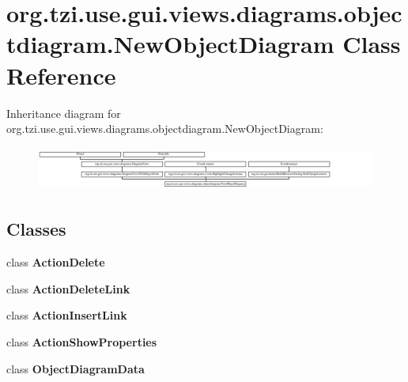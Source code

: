 \hypertarget{classorg_1_1tzi_1_1use_1_1gui_1_1views_1_1diagrams_1_1objectdiagram_1_1_new_object_diagram}{\section{org.\-tzi.\-use.\-gui.\-views.\-diagrams.\-objectdiagram.\-New\-Object\-Diagram Class Reference}
\label{classorg_1_1tzi_1_1use_1_1gui_1_1views_1_1diagrams_1_1objectdiagram_1_1_new_object_diagram}
}
Inheritance diagram for org.\-tzi.\-use.\-gui.\-views.\-diagrams.\-objectdiagram.\-New\-Object\-Diagram\-:\begin{figure}[H]
\begin{center}
\leavevmode
\includegraphics[height=1.447028cm]{classorg_1_1tzi_1_1use_1_1gui_1_1views_1_1diagrams_1_1objectdiagram_1_1_new_object_diagram}
\end{center}
\end{figure}
\subsection*{Classes}
\begin{DoxyCompactItemize}
\item 
class {\bfseries Action\-Delete}
\item 
class {\bfseries Action\-Delete\-Link}
\item 
class {\bfseries Action\-Insert\-Link}
\item 
class {\bfseries Action\-Show\-Properties}
\item 
class {\bfseries Object\-Diagram\-Data}
\end{DoxyCompactItemize}
